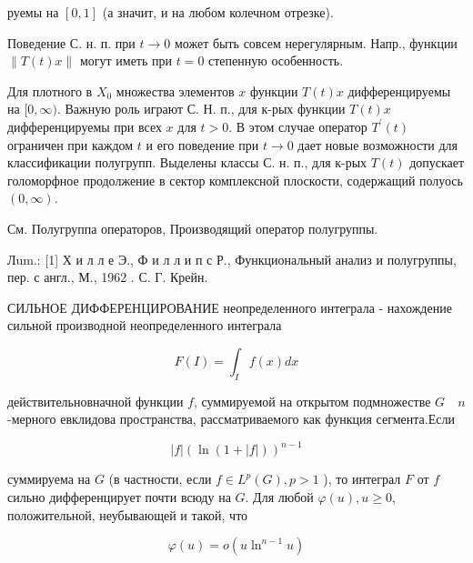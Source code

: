 \documentclass[10pt]{article}
\begin{document}
руемы на $[0,1]$ (а значит, и на любом колечном отрезке).



Поведение С. н. п. при $t \rightarrow 0$ может быть совсем нерегулярным. Напр., функции $\|T(t) x\|$ могут иметь при $t=0$ степенную особенность.



Для плотного в $X_{0}$ множества элементов $x$ функции $T(t) x$ дифференцируемы на $[0, \infty)$. Важную роль играют С. Н. п., для к-рых функции $T(t) x$ дифференцируемы при всех $x$ для $t>0$. В этом случае оператор $T^{\prime}(t)$ ограничен при каждом $t$ и его поведение при $t \rightarrow 0$ дает новые возможности для классификации полугрупп. Выделены классы С. н. п., для к-рых $T(t)$ допускает голоморфное продолжение в сектор комплексной плоскости, содержащий полуось $(0, \infty)$.



См. Полугруппа операторов, Производящий оператор полугруппы.



Лum.: [1] Х и л л е Э., Ф и л л и п с Р., Функциональный анализ и полугруппы, пер. с англ., М., 1962 . С. Г. Крейн.



СИЛЬНОЕ ДИФФЕРЕНЦИРОВАНИЕ неопределенного интеграла - нахождение сильной производной неопределенного интеграла



\[

F(I)=\int_{I} f(x) d x

\]



действительновначной функции $f$, суммируемой на открытом подмножестве $G \quad n$-мерного евклидова пространства, рассматриваемого как функция сегмента.Если



\[

|f|(\ln (1+|f|))^{n-1}

\]



суммируема на $G$ (в частности, если $f \in L^{p}(G), p>1$ ), то интеграл $F$ от $f$ сильно дифференцирует почти всюду на $G$. Для любой $\varphi(u), u \geqslant 0$, положительной, неубывающей и такой, что



\[

\varphi(u)=o\left(u \ln ^{n-1} u\right)

\]
\end{document}
